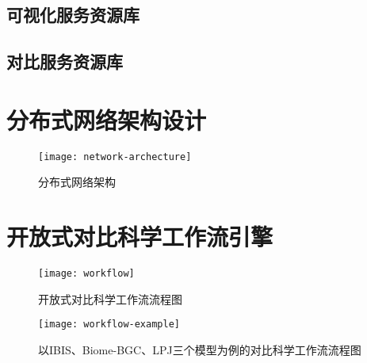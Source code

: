 \subsection{可视化服务资源库}
\subsection{对比服务资源库}

\section{分布式网络架构设计}
\begin{figure}
    \centering
    \texttt{[image: network-archecture]}
    \caption{分布式网络架构}
    \label{fig:network-archecture}
\end{figure}

\section{开放式对比科学工作流引擎}
\begin{figure}
    \centering
    \texttt{[image: workflow]}
    \caption{开放式对比科学工作流流程图}
    \label{fig:workflow}
\end{figure}

\begin{figure}
    \centering
    \texttt{[image: workflow-example]}
    \caption{以IBIS、Biome-BGC、LPJ三个模型为例的对比科学工作流流程图}
    \label{fig:workflow-example}
\end{figure}



